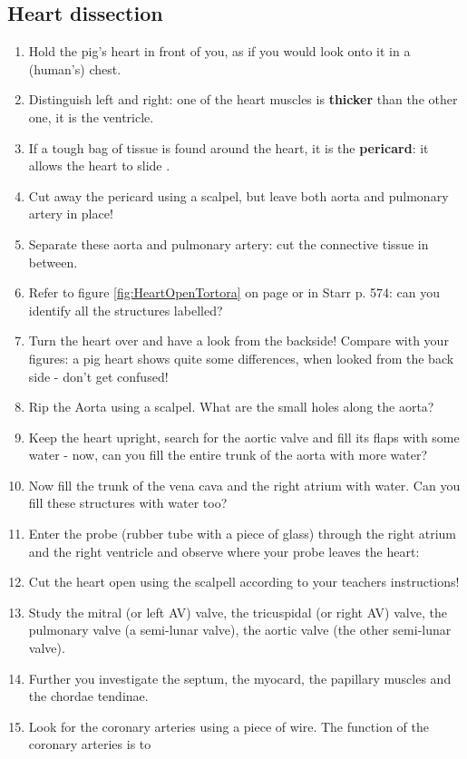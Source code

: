	\subsection{Heart dissection}
			\begin{enumerate}[label=\textit{(\arabic*)},leftmargin=0em,series=labcounter]
		      \item Hold the pig's heart in front of you, as if you would look onto it in a (human's) chest.
		      \item Distinguish left and right: one of the heart muscles is \textbf{thicker} than the other one, it is the  ventricle.
		      \item If a tough bag of tissue is found around the heart, it is the \textbf{pericard}: it allows the heart to slide .
		      \item Cut away the pericard using a scalpel, but leave both aorta and pulmonary artery in place!
		      \item Separate these aorta and pulmonary artery: cut the connective tissue in between.
		      \item Refer to figure \ref{fig:HeartOpenTortora} on page \pageref{fig:HeartOpenTortora} or in  Starr p. 574: can you identify all the structures labelled?
		      \item Turn the heart over and have a look from the backside! Compare with your figures: a pig heart shows quite some differences, when looked from the back side - don't get confused!
		      \item Rip the Aorta using a scalpel. What are the small holes along the aorta?
		      \item Keep the heart upright, search for the aortic valve and fill its flaps with some water - now, can you fill the entire trunk of the aorta with more water? 
		      \item Now fill the trunk of the vena cava and the right atrium with water. Can you fill these structures with water too? 
		      \item Enter the probe (rubber tube with a piece of glass) through the right atrium and the right ventricle and observe where your probe leaves the heart: 
		      \item Cut the heart open using the scalpell according to your teachers instructions!
		      \item Study the mitral (or left AV) valve, the tricuspidal (or right AV) valve, the pulmonary valve (a semi-lunar valve), the aortic valve (the other semi-lunar valve).
		      \item Further you investigate the septum, the myocard, the papillary muscles and the chordae tendinae.
		      \item Look for the coronary arteries using a piece of wire. The function of the coronary arteries is to 
		\end{enumerate}

